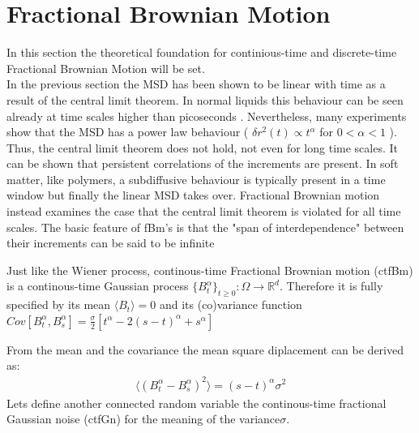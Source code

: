 \documentclass[
  a4paper,BCOR10mm,oneside,
  bibtotoc,idxtotoc,
  headsepline,footsepline,%
  fleqn,openbib
]{scrbook}
\begin{document}


\section{Fractional Brownian Motion}\label{sectionfrac}
In this section the theoretical foundation for continious-time and discrete-time Fractional Brownian Motion will be set. \\
In the previous section the MSD has been shown to be linear with time as a result of the central limit theorem. In normal liquids this behaviour can be seen already at time scales higher than picoseconds \cite{Hofling2013}. Nevertheless, many experiments show that the MSD has a power law behaviour ( $\delta r ^2 (t) \propto t^{\alpha}$ for  $0 < \alpha < 1$ ). Thus, the central limit theorem does not hold, not even for long time scales. It can be shown that persistent correlations of the increments are present. In soft matter, like polymers, a subdiffusive behaviour is typically present in a time window but finally the linear MSD takes over. Fractional Brownian motion instead examines the case that the central limit theorem is violated for all time scales. The basic feature of fBm's is that the "span of interdependence" between their increments can be said to be infinite \cite{Mandelbrot1968}\\
\begin{mydef}
Just like the Wiener process, continous-time Fractional Brownian motion (ctfBm) is a continous-time Gaussian process $\{B^{\alpha}_t\}_{t\geq0}: \Omega \rightarrow \mathbb{R}^d$. Therefore it is fully specified by its mean $\langle B_t \rangle=0$ and its (co)variance function $Cov[B^{\alpha}_t,B^{\alpha}_s]=\frac{\sigma}{2}[t^{\alpha}-2(s-t)^{\alpha}+s^{\alpha}]$
\end{mydef}
From the mean and the covariance the mean square diplacement can be derived as: 
\begin{align}
 \langle (B^{\alpha}_{t}-B^{\alpha}_{s})^2 \rangle = (s-t)^\alpha \sigma^2
\end{align}
Lets define another connected random variable the continous-time fractional Gaussian noise (ctfGn)  for the meaning of the variance$\sigma$.
\end{document}
